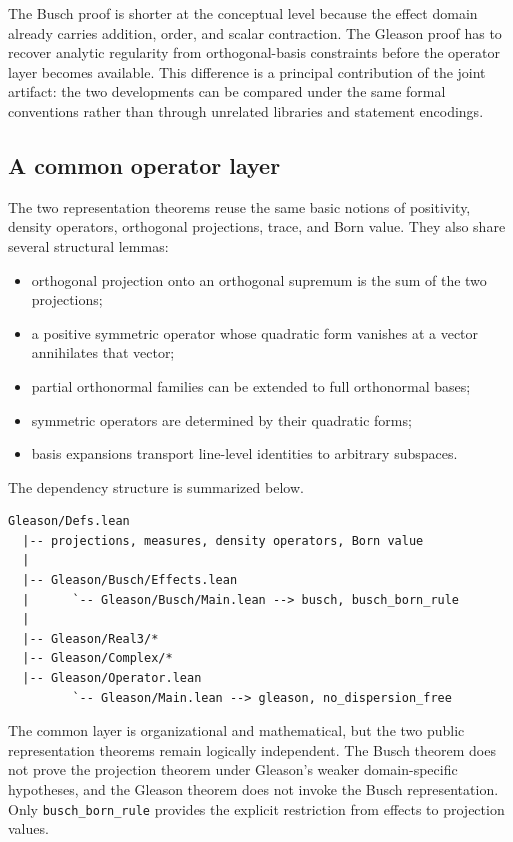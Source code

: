 \documentclass[pdflatex,sn-mathphys-num]{sn-jnl}
\providecommand{\passthrough}[1]{#1}
\theoremstyle{thmstyleone}
\theoremstyle{thmstylethree}
\begin{document}
The Busch proof is shorter at the conceptual level because the effect domain already carries addition, order, and scalar contraction. The Gleason proof has to recover analytic regularity from orthogonal-basis constraints before the operator layer becomes available. This difference is a principal contribution of the joint artifact: the two developments can be compared under the same formal conventions rather than through unrelated libraries and statement encodings.

\subsection{A common operator layer}\label{a-common-operator-layer}

The two representation theorems reuse the same basic notions of positivity, density operators, orthogonal projections, trace, and Born value. They also share several structural lemmas:

\begin{itemize}
\item
  orthogonal projection onto an orthogonal supremum is the sum of the two projections;
\item
  a positive symmetric operator whose quadratic form vanishes at a vector annihilates that vector;
\item
  partial orthonormal families can be extended to full orthonormal bases;
\item
  symmetric operators are determined by their quadratic forms;
\item
  basis expansions transport line-level identities to arbitrary subspaces.
\end{itemize}

The dependency structure is summarized below.

\begin{lstlisting}
Gleason/Defs.lean
  |-- projections, measures, density operators, Born value
  |
  |-- Gleason/Busch/Effects.lean
  |      `-- Gleason/Busch/Main.lean --> busch, busch_born_rule
  |
  |-- Gleason/Real3/*
  |-- Gleason/Complex/*
  |-- Gleason/Operator.lean
         `-- Gleason/Main.lean --> gleason, no_dispersion_free
\end{lstlisting}

The common layer is organizational and mathematical, but the two public representation theorems remain logically independent. The Busch theorem does not prove the projection theorem under Gleason's weaker domain-specific hypotheses, and the Gleason theorem does not invoke the Busch representation. Only \passthrough{\lstinline!busch_born_rule!} provides the explicit restriction from effects to projection values.
\end{document}
